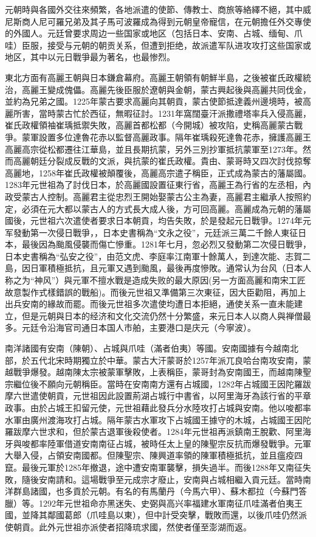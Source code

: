 元朝時與各國外交往來頻繁，各地派遣的使節、傳教士、商旅等絡繹不絕，其中威尼斯商人尼可羅兄弟及其子馬可波羅成為得到元朝皇帝寵信，在元朝擔任外交專使的外國人。元廷曾要求周边一些国家或地区（包括日本、安南、占城、缅甸、爪哇）臣服，接受与元朝的朝贡关系，但遭到拒绝，故派遣军队进攻攻打这些国家或地区，其中以元日戰爭最为著名，也最惨烈。

東北方面有高麗王朝與日本鎌倉幕府。高麗王朝領有朝鮮半島，之後被崔氏政權統治，高麗王變成傀儡。高麗先後臣服於遼朝與金朝，蒙古興起後與高麗共同伐金，並約為兄弟之國。1225年蒙古要求高麗向其朝貢，蒙古使節抵達義州邊境時，被高麗所害，當時蒙古忙於西征，無暇征討。1231年窩闊臺汗派撒禮塔率兵入侵高麗，崔氏政權領袖崔瑀抵禦失敗，高麗首都松都（今開城）被攻陷，史稱高麗蒙古戰爭。蒙軍設置多位達魯花赤以監督高麗政事。隔年崔瑀殺死達魯花赤，擁護高麗王高麗高宗從松都遷往江華島，並且長期抗蒙，另外三別抄軍抵抗蒙軍至1273年。然而高麗朝廷分裂成反戰的文派，與抗蒙的崔氏政權。貴由、蒙哥時又四次討伐掠奪高麗地，1258年崔氏政權被顛覆後，高麗高宗遣子稱臣，正式成為蒙古的藩屬國。1283年元世祖為了討伐日本，於高麗國設置征東行省，高麗王為行省的左丞相，內政受蒙古人控制。高麗君主從忠烈王開始娶蒙古公主為妻，高麗君主繼承人按照約定，必須在元大都以蒙古人的方式長大成人後，方可回高麗。高麗成為元朝的藩屬國後，元世祖六次遣使者要求日本朝貢，均告失敗，於是發起元日戰爭。1274年元军發動第一次侵日戰爭，，日本史書稱為“文永之役”，元廷派三萬二千餘人東征日本，最後因為颱風侵襲而傷亡慘重。1281年七月，忽必烈又發動第二次侵日戰爭，日本史書稱為“弘安之役”，由范文虎、李庭率江南軍十餘萬人，到達次能、志賀二島，因日軍積極抵抗，且元軍又遇到颱風，最後再度慘敗。通常认为台风（日本人称之为“神风”）與元軍不擅水戰是造成失败的最大原因(另一方面高麗和南宋工匠故意製作式樣錯誤的戰船)。而後元世祖又準備第三次東征，因大臣勸阻，再加上出兵安南的緣故而罷。而後元世祖多次遣使均遭日本拒絕，通使关系一直未能建立，但是元朝與日本的经济和文化交流仍然十分繁盛，来元日本人以商人與禅僧最多。元廷令沿海官司通日本国人市舶，主要港口是庆元（今寧波）。

南洋諸國有安南（陳朝）、占城與爪哇（滿者伯夷）等國。安南國據有今越南北部，於五代北宋時期獨立於中華。蒙古大汗蒙哥於1257年派兀良哈台南攻安南，蒙越戰爭爆發。越南陳太宗被蒙軍擊敗，上表稱臣，蒙哥封為安南國王，而越南陳聖宗繼位後不願向元朝稱臣。當時在安南南方還有占城國，1282年占城國王因陀羅跋摩六世遣使朝貢，元世祖因此設置荊湖占城行中書省，以阿里海牙為該行省的平章政事。由於占城王扣留元使，元世祖藉此發兵分水陸攻打占城與安南。他以唆都率水軍由廣州渡海攻打占城。隔年蒙古水軍攻下占城國王據守的木城，占城國王因陀羅跋摩六世求和，但於蒙古退軍後殺使者。1284年元世祖再派鎮南王脫歡、阿里海牙與唆都率陸軍借道安南南征占城，被時任太上皇的陳聖宗反抗而爆發戰爭。元軍大舉入侵，占領安南國都。但陳聖宗、陳興道率領的陳軍積極抵抗，並且瘟疫四竄。最後元軍於1285年撤退，途中遭安南軍襲擊，損失過半。而後1288年又南征失敗，隨後安南請和。這場戰爭至元成宗才廢止，安南與占城相繼入貢元廷。當時南洋群島諸國，也多貢於元朝。有名的有馬蘭丹（今馬六甲）、蘇木都拉（今蘇門答臘）等。1292年元世祖命亦黑迷失、史弼與高兴率福建水軍南征爪哇滿者伯夷王國，並降其鄰國葛郎（爪哇島以東），但中計受突擊，戰敗而還，以後爪哇仍然派使朝貢。此外元世祖亦派使者招降琉求國，然使者僅至澎湖而返。

